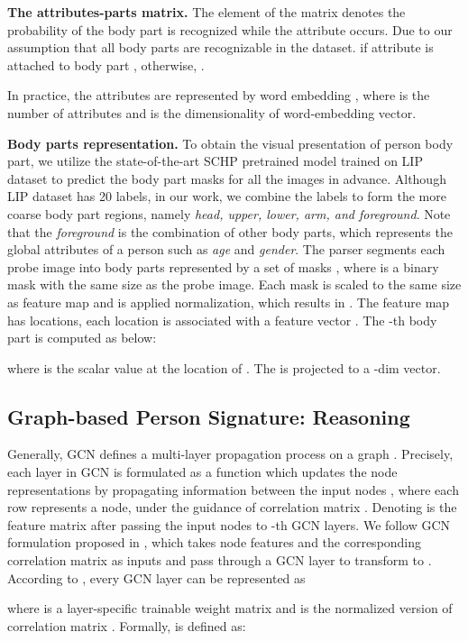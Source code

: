\documentclass[final]{cvpr}
\begin{document}
\textbf{The attributes-parts matrix.} The element of the matrix  denotes the probability of the body part  is recognized while the attribute  occurs. Due to our assumption that all body parts are recognizable in the dataset.  if attribute  is attached to body part , otherwise, .


In practice, the attributes are represented by word embedding , where  is the number of attributes and  is the dimensionality of word-embedding vector.

\textbf{Body parts representation.} To obtain the visual presentation of person body part, we utilize the state-of-the-art SCHP pretrained model \cite{li2019self} trained on LIP dataset \cite{lip} to predict the body part masks for all the images in advance. Although LIP dataset has 20 labels, in our work, we combine the labels to form the more coarse body part regions, namely \textit{head, upper, lower, arm, and foreground}. Note that the \textit{foreground} is the combination of other body parts, which represents the global attributes of a person such as \textit{age} and \textit{gender}. The parser segments each probe image into  body parts represented by a set of masks , where  is a binary mask with the same size as the probe image. 
Each mask  is scaled to the same size as feature map  and is applied  normalization, which results in . The feature map  has  locations, each location  is associated with a feature vector . The -th body part  is computed as below:


where  is the scalar value at the location  of . The  is projected to a -dim vector.

\subsection{Graph-based Person Signature: Reasoning}
Generally, GCN defines a multi-layer propagation process on a graph . Precisely, each layer in GCN is formulated as a function  which updates the node representations by propagating information between the input nodes , where each row represents a node, under the guidance of correlation matrix .
Denoting  is the feature matrix after passing the input nodes  to -th GCN layers. We follow GCN formulation proposed in \cite{kipf2016semi}, which takes node features  and the corresponding correlation matrix  as inputs and pass through a GCN layer to transform to . According to \cite{kipf2016semi}, every GCN layer can be represented as 

where  is a layer-specific trainable weight matrix and  is the normalized version of correlation matrix . Formally,  is defined as:
\end{document}
